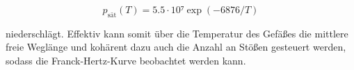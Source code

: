 \begin{equation*}
    p_\text{sät}(T) = 5.5\cdot10⁷\exp\left(-6876/T\right)
\end{equation*}

\noindent niederschlägt. Effektiv kann somit über die Temperatur des Gefäßes die mittlere freie Weglänge und kohärent dazu auch die Anzahl an Stößen gesteuert werden, 
sodass die Franck-Hertz-Kurve beobachtet werden kann.


